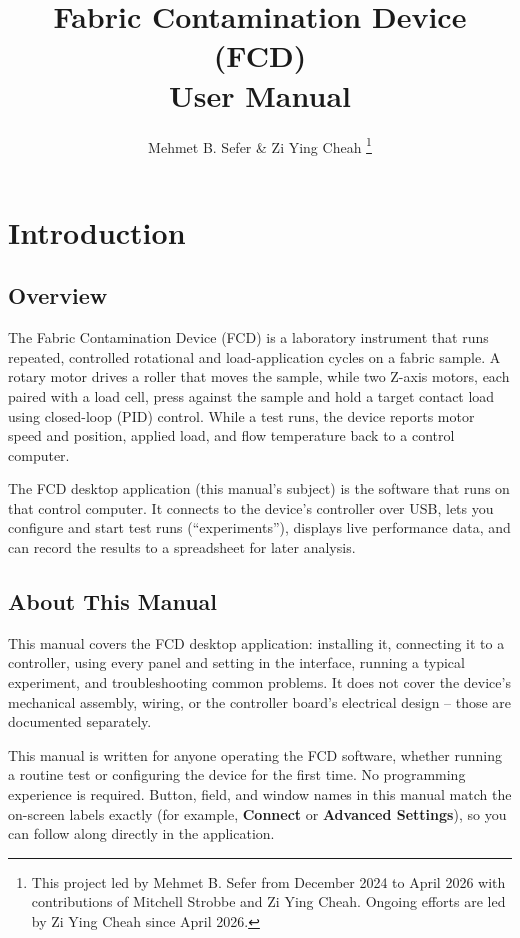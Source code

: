 \documentclass[12pt]{report}
\begin{document}
\title{\textbf{Fabric Contamination Device (FCD) \\ User Manual}}
\author{Mehmet B. Sefer \& Zi Ying Cheah \thanks{This project led by Mehmet B. Sefer from December 2024 to April 2026
with contributions of Mitchell Strobbe and Zi Ying Cheah. Ongoing efforts are led by Zi Ying Cheah since April 2026.}}

\maketitle

\tableofcontents
\listoffigures
\newpage

\chapter{Introduction}

\section{Overview}
The Fabric Contamination Device (FCD) is a laboratory instrument that runs repeated, controlled rotational and load-application cycles on a fabric sample. A rotary motor drives a roller that moves the sample, while two Z-axis motors, each paired with a load cell, press against the sample and hold a target contact load using closed-loop (PID) control. While a test runs, the device reports motor speed and position, applied load, and flow temperature back to a control computer.

The FCD desktop application (this manual's subject) is the software that runs on that control computer. It connects to the device's controller over USB, lets you configure and start test runs (``experiments''), displays live performance data, and can record the results to a spreadsheet for later analysis.

\section{About This Manual}
This manual covers the FCD desktop application: installing it, connecting it to a controller, using every panel and setting in the interface, running a typical experiment, and troubleshooting common problems. It does not cover the device's mechanical assembly, wiring, or the controller board's electrical design -- those are documented separately.

This manual is written for anyone operating the FCD software, whether running a routine test or configuring the device for the first time. No programming experience is required. Button, field, and window names in this manual match the on-screen labels exactly (for example, \textbf{Connect} or \textbf{Advanced Settings}), so you can follow along directly in the application.
\end{document}
